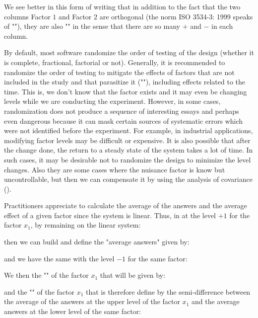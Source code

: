 	We see better in this form of writing that in addition to the fact that the two columns Factor $1$ and Factor $2$ are orthogonal (the norm ISO 3534-3: 1999 speaks of ""), they are also "" in the sense that there are so many $+$ and $-$ in each column.
	\begin{tcolorbox}[title=Remark,colframe=black,arc=10pt]
	By default, most software randomize the order of testing of the design (whether it is complete, fractional, factorial or not). Generally, it is recommended to randomize the order of testing to mitigate the effects of factors that are not included in the study and that parasitize it (""), including effects related to the time. This is, we don't know that the factor exists and it may even be changing levels while we are conducting the experiment. However, in some cases, randomization does not produce a sequence of interesting essays and perhaps even dangerous because it can mask certain sources of systematic errors which were not identified before the experiment. For example, in industrial applications, modifying factor levels may be difficult or expensive. It is also possible that after the change done, the return to a steady state of the system takes a lot of time. In such cases, it may be desirable not to randomize the design to minimize the level changes. Also they are some cases where the nuisance factor is know but uncontrollable, but then we can compensate it by using the analysis of covariance ().
	\end{tcolorbox}
	Practitioners appreciate to calculate the average of the answers and the average effect of a given factor since the system is linear. Thus, in at the level $+1$ for the factor $x_1$, by remaining on the linear system:
	
	then we can build and define the "average answers" given by:
	
	and we have the same with the level $-1$ for the same factor:
	
	We then the "" of the factor $x_1$ that will be given by:
	
	and the "" of the factor $x_1$ that is therefore define by the semi-difference between the average of the answers at the upper level of the factor $x_1$ and the average answers at the lower level of the same factor:
	
